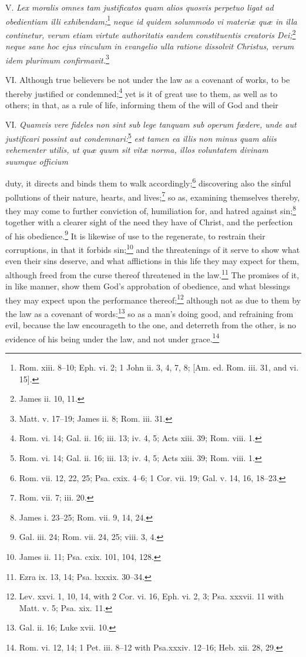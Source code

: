 V. \emph{Lex moralis omnes tam justificatos quam alios quosvis perpetuo ligat ad obedientiam illi exhibendam;}\footnote{Rom. xiii. 8–10; Eph. vi. 2; 1 John ii. 3, 4, 7, 8; [Am. ed. Rom. iii. 31, and vi. 15].}\emph{ neque id quidem solummodo vi materiæ quæ in illa continetur, verum etiam virtute authoritatis eandem constituentis creatoris Dei;}\footnote{James ii. 10, 11.}\emph{ neque sane hoc ejus vinculum in evangelio ulla ratione dissolvit Christus, verum idem plurimum confirmavit.}\footnote{Matt. v. 17–19; James ii. 8; Rom. iii. 31.}

VI. Although true believers be not under the law as a covenant of works, to be thereby justified or condemned;\footnote{Rom. vi. 14; Gal. ii. 16; iii. 13; iv. 4, 5; Acts xiii. 39; Rom. viii. 1.} yet is it of great use to them, as well as to others; in that, as a rule of life, informing them of the will of God and their

VI. \emph{Quamvis vere fideles non sint sub lege tanquam sub operum fœdere, unde aut justificari possint aut condemnari:}\footnote{Rom. vi. 14; Gal. ii. 16; iii. 13; iv. 4, 5; Acts xiii. 39; Rom. viii. 1.}\emph{ est tamen ea illis non minus quam aliis vehementer utilis, ut quæ quum sit vitæ norma, illos voluntatem divinam suumque officium }

duty, it directs and binds them to walk accordingly;\footnote{Rom. vii. 12, 22, 25; Psa. cxix. 4–6; 1 Cor. vii. 19; Gal. v. 14, 16, 18–23.} discovering also the sinful pollutions of their nature, hearts, and lives;\footnote{Rom. vii. 7; iii. 20.} so as, examining themselves thereby, they may come to further conviction of, humiliation for, and hatred against sin;\footnote{James i. 23–25; Rom. vii. 9, 14, 24.} together with a clearer sight of the need they have of Christ, and the perfection of his obedience.\footnote{Gal. iii. 24; Rom. vii. 24, 25; viii. 3, 4.} It is likewise of use to the regenerate, to restrain their corruptions, in that it forbids sin;\footnote{James ii. 11; Psa. cxix. 101, 104, 128.} and the threatenings of it serve to show what even their sins deserve, and what afflictions in this life they may expect for them, although freed from the curse thereof threatened in the law.\footnote{Ezra ix. 13, 14; Psa. lxxxix. 30–34.} The promises of it, in like manner, show them God's approbation of obedience, and what blessings they may expect upon the performance thereof;\footnote{Lev. xxvi. 1, 10, 14, with 2 Cor. vi. 16, Eph. vi. 2, 3; Psa. xxxvii. 11 with Matt. v. 5; Psa. xix. 11.} although not as due to them by the law as a covenant of words:\footnote{Gal. ii. 16; Luke xvii. 10.} so as a man's doing good, and refraining from evil, because the law encourageth to the one, and deterreth from the other, is no evidence of his being under the law, and not under grace.\footnote{Rom. vi. 12, 14; 1 Pet. iii. 8–12 with Psa.xxxiv. 12–16; Heb. xii. 28, 29.}

